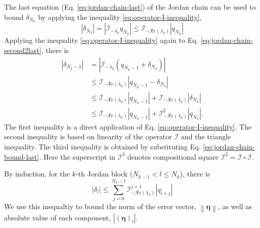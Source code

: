 \documentclass[accepted]{uai2023}
\newcommand{\Err}{\eta}
\newcommand{\I}{\mathcal{I}}
\renewcommand{\Re}[1]{\mathcal{R}e\left(#1\right)}
\begin{document}
    The last equation (Eq. \ref{eq:jordan-chain-last}) of the Jordan chain can be used to bound $\delta_{N_k}$ by applying the inequality \ref{eq:operator-I-inequality}, 
    \begin{equation}\label{eq:jordan-chain-bound-last}
        |\delta_{N_k}| = \left|\I_{-\lambda_k}q_{N_k}\right| \leq \I_{-\Re{\lambda_k}} |q_{N_k}|
    \end{equation}
    Applying the inequality \ref{eq:operator-I-inequality} again to Eq. \ref{eq:jordan-chain-second2last}, there is
    \begin{align}
        |\delta_{N_k-1}| &= \left|\I_{-\lambda_k}\left(q_{N_k - 1} + \delta_{N_k}\right)\right| \\
        &\leq \I_{-\Re{\lambda_k}} |q_{N_k - 1} - \delta_{N_k}| \\
        &\leq \I_{-\Re{\lambda_k}} |q_{N_k - 1}| + \I_{-\Re{\lambda_k}} |\delta_{N_k}| \\
        &\leq \I_{-\Re{\lambda_k}} |q_{N_k - 1}| + \I_{-\Re{\lambda_k}}^2 |q_{N_k}|.
    \end{align}
    The first inequality is a direct application of Eq. \ref{eq:operator-I-inequality}. 
    The second inequality is based on linearity of the operator $\I$ and the triangle inequality. 
    The third inequality is obtained by substituting Eq. \ref{eq:jordan-chain-bound-last}.
    Here the superscript in $\I^2$ denotes compositional square $\I^2 = \I\circ\I$.

    By induction, for the $k$-th Jordan block ($N_{k-1} < l \leq N_k$), there is
    \begin{equation}\label{eq:system-scalar-inequality-transformed}
        |\delta_{l}|  \leq \sum_{j=0}^{N_k - l} \I_{-\Re{\lambda_k}} ^ {j+1} |q_{l+j}|
    \end{equation}
    We use this inequaltiy to bound the norm of the error vector, $\left\|\pmb{\Err}\right\|$, as well as absolute value of each component, $\left|\left(\pmb{\Err}\right)_l\right|$. 
\end{document}

